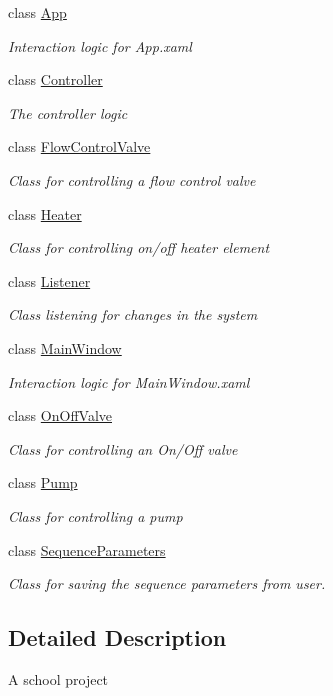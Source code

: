 \begin{DoxyCompactItemize}
\item 
class \hyperlink{class_a_s_e6030_1_1_app}{App}
\begin{DoxyCompactList}\small\item\em Interaction logic for App.\+xaml \end{DoxyCompactList}\item 
class \hyperlink{class_a_s_e6030_1_1_controller}{Controller}
\begin{DoxyCompactList}\small\item\em The controller logic \end{DoxyCompactList}\item 
class \hyperlink{class_a_s_e6030_1_1_flow_control_valve}{Flow\+Control\+Valve}
\begin{DoxyCompactList}\small\item\em Class for controlling a flow control valve \end{DoxyCompactList}\item 
class \hyperlink{class_a_s_e6030_1_1_heater}{Heater}
\begin{DoxyCompactList}\small\item\em Class for controlling on/off heater element \end{DoxyCompactList}\item 
class \hyperlink{class_a_s_e6030_1_1_listener}{Listener}
\begin{DoxyCompactList}\small\item\em Class listening for changes in the system \end{DoxyCompactList}\item 
class \hyperlink{class_a_s_e6030_1_1_main_window}{Main\+Window}
\begin{DoxyCompactList}\small\item\em Interaction logic for Main\+Window.\+xaml \end{DoxyCompactList}\item 
class \hyperlink{class_a_s_e6030_1_1_on_off_valve}{On\+Off\+Valve}
\begin{DoxyCompactList}\small\item\em Class for controlling an On/\+Off valve \end{DoxyCompactList}\item 
class \hyperlink{class_a_s_e6030_1_1_pump}{Pump}
\begin{DoxyCompactList}\small\item\em Class for controlling a pump \end{DoxyCompactList}\item 
class \hyperlink{class_a_s_e6030_1_1_sequence_parameters}{Sequence\+Parameters}
\begin{DoxyCompactList}\small\item\em Class for saving the sequence parameters from user. \end{DoxyCompactList}\end{DoxyCompactItemize}


\subsection{Detailed Description}
A school project 

